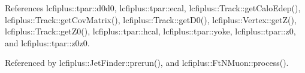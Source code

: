 References lcfiplus\+::tpar\+::d0d0, lcfiplus\+::tpar\+::ecal, lcfiplus\+::\+Track\+::get\+Calo\+Edep(), lcfiplus\+::\+Track\+::get\+Cov\+Matrix(), lcfiplus\+::\+Track\+::get\+D0(), lcfiplus\+::\+Vertex\+::get\+Z(), lcfiplus\+::\+Track\+::get\+Z0(), lcfiplus\+::tpar\+::hcal, lcfiplus\+::tpar\+::yoke, lcfiplus\+::tpar\+::z0, and lcfiplus\+::tpar\+::z0z0.



Referenced by lcfiplus\+::\+Jet\+Finder\+::prerun(), and lcfiplus\+::\+Ft\+N\+Muon\+::process().


